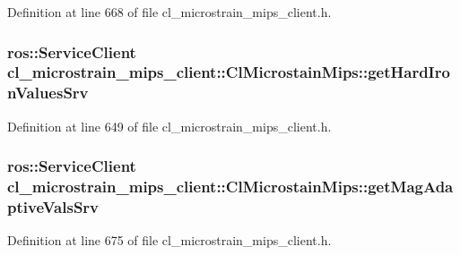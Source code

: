 Definition at line 668 of file cl\+\_\+microstrain\+\_\+mips\+\_\+client.\+h.

\subsubsection[{\texorpdfstring{get\+Hard\+Iron\+Values\+Srv}{getHardIronValuesSrv}}]{\setlength{\rightskip}{0pt plus 5cm}ros\+::\+Service\+Client cl\+\_\+microstrain\+\_\+mips\+\_\+client\+::\+Cl\+Microstain\+Mips\+::get\+Hard\+Iron\+Values\+Srv\hspace{0.3cm}{\ttfamily [protected]}}\hypertarget{classcl__microstrain__mips__client_1_1ClMicrostainMips_a51a981a977a5141f4c417c947dc40e71}{}\label{classcl__microstrain__mips__client_1_1ClMicrostainMips_a51a981a977a5141f4c417c947dc40e71}


Definition at line 649 of file cl\+\_\+microstrain\+\_\+mips\+\_\+client.\+h.

\subsubsection[{\texorpdfstring{get\+Mag\+Adaptive\+Vals\+Srv}{getMagAdaptiveValsSrv}}]{\setlength{\rightskip}{0pt plus 5cm}ros\+::\+Service\+Client cl\+\_\+microstrain\+\_\+mips\+\_\+client\+::\+Cl\+Microstain\+Mips\+::get\+Mag\+Adaptive\+Vals\+Srv\hspace{0.3cm}{\ttfamily [protected]}}\hypertarget{classcl__microstrain__mips__client_1_1ClMicrostainMips_a69d777f77520e9cb8c01bdb5b143e5c6}{}\label{classcl__microstrain__mips__client_1_1ClMicrostainMips_a69d777f77520e9cb8c01bdb5b143e5c6}


Definition at line 675 of file cl\+\_\+microstrain\+\_\+mips\+\_\+client.\+h.

